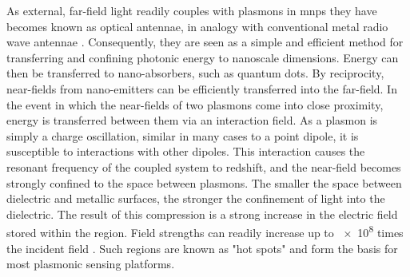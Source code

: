 \documentclass[12pt, a4paper, twoside]{book}
\begin{document}
As external, far-field light readily couples with plasmons in \glspl{mnp} they have becomes known as optical antennae, in analogy with conventional metal radio wave antennae \cite{novotny2011}. Consequently, they are seen as a simple and efficient method for transferring and confining photonic energy to nanoscale dimensions. Energy can then be transferred to nano-absorbers, such as quantum dots. By reciprocity, near-fields from nano-emitters can be efficiently transferred into the far-field.
In the event in which the near-fields of two plasmons come into close proximity, energy is transferred between them via an interaction field. As a plasmon is simply a charge oscillation, similar in many cases to a {\color{red}point} dipole, it is susceptible to interactions with other dipoles. This interaction causes the resonant frequency of the coupled system to redshift, and the near-field becomes strongly confined to the space between plasmons. The smaller the space between dielectric and metallic surfaces, the stronger the confinement of light into the dielectric. The result of this compression is a strong increase in the electric field stored within the region. Field strengths can readily increase up to \num{e8} times the incident field \cite{}. Such regions are known as "hot spots" and form the basis for most plasmonic sensing platforms.
\end{document}
